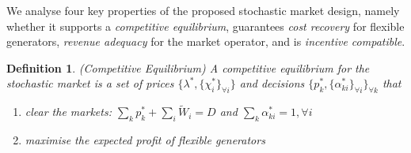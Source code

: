 \documentclass{article}
\newtheorem{definition}{Definition}
\begin{document}
We analyse four key properties of the proposed stochastic market design, namely whether it supports a \textit{competitive equilibrium}, guarantees \textit{cost recovery} for flexible generators, \textit{revenue adequacy} for the market operator, and is \textit{incentive compatible}.

\begin{definition}
(Competitive Equilibrium) A competitive equilibrium for the stochastic market is a set of prices $\{\lambda^*, \{\chi_i^*\}_{\forall i}\}$ and decisions $\{p_k^*, \{\alpha_{ki}^*\}_{\forall i}\}_{\forall k}$ that\vspace{-5pt}
\begin{enumerate}
\item clear the markets: $\sum_k p_k^* + \sum_i \tilde{W}_i = D$ and $\sum_k \alpha_{ki}^* = 1, \forall i$\vspace{-5pt}
\item maximise the expected profit of flexible generators
\end{enumerate}
\end{definition}
\end{document}
